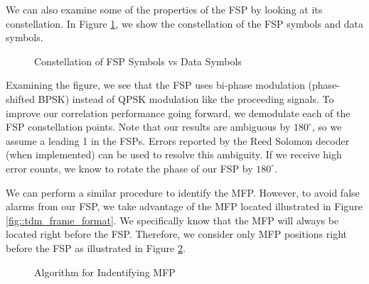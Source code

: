 \documentclass[conference,onecolumn]{IEEEtran}
\begin{document}
We can also examine some of the properties of the FSP by looking at its constellation. In Figure \ref{fig::fsp_constellation}, we show the constellation of the FSP symbols and data symbols.

\begin{figure}[H]
	\centerline{}
	\caption{Constellation of FSP Symbols vs Data Symbols}
	\label{fig::fsp_constellation}
\end{figure}

Examining the figure, we see that the FSP uses bi-phase modulation (phase-shifted BPSK) instead of QPSK modulation like the proceeding signals. To 
improve our correlation performance going forward, we demodulate each of the FSP constellation points. Note that our results are ambiguous by $180^{\circ}$, so we assume a leading 1 in the FSPs. Errors reported by the Reed Solomon decoder (when implemented) can be used to resolve this ambiguity. If we receive high error counts, we know to rotate the phase of our FSP by $180^{\circ}$.

We can perform a similar procedure to identify the MFP. However, to avoid false alarms from our FSP, we take advantage of the MFP located illustrated in Figure \ref{fig::tdm_frame_format}. We specifically know that the MFP will always be located right before the FSP. Therefore, we consider only MFP positions right before the FSP as illustrated in Figure \ref{fig::finding_mfp}.

\begin{figure}[H]
	\centerline{}
	\caption{Algorithm for Indentifying MFP}
	\label{fig::finding_mfp}
\end{figure}
\end{document}
